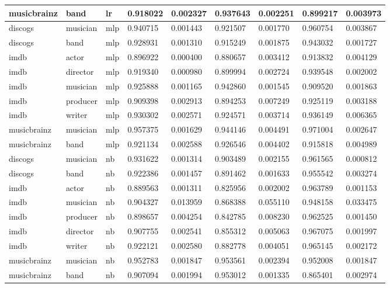 \documentclass[epsfig,a4paper,11pt,titlepage,twoside,openany]{book}
\begin{document}
\begin{longtable}{|l|l|l|l|l|l|l|l|l|}
musicbrainz & band     & lr    & 0.918022 & 0.002327 & 0.937643  & 0.002251 & 0.899217 & 0.003973 \\ \hline
discogs     & musician & mlp   & 0.940715 & 0.001443 & 0.921507  & 0.001770 & 0.960754 & 0.003867 \\
discogs     & band     & mlp   & 0.928931 & 0.001310 & 0.915249  & 0.001875 & 0.943032 & 0.001727 \\
imdb        & actor    & mlp   & 0.896922 & 0.000400 & 0.880657  & 0.003412 & 0.913832 & 0.004129 \\
imdb        & director & mlp   & 0.919340 & 0.000980 & 0.899994  & 0.002724 & 0.939548 & 0.002002 \\
imdb        & musician & mlp   & 0.925888 & 0.001165 & 0.942860  & 0.001545 & 0.909520 & 0.001863 \\
imdb        & producer & mlp   & 0.909398 & 0.002913 & 0.894253  & 0.007249 & 0.925119 & 0.003188 \\
imdb        & writer   & mlp   & 0.930302 & 0.002571 & 0.924571  & 0.003714 & 0.936149 & 0.006365 \\
musicbrainz & musician & mlp   & 0.957375 & 0.001629 & 0.944146  & 0.004491 & 0.971004 & 0.002647 \\ 
musicbrainz & band     & mlp   & 0.921134 & 0.002588 & 0.926546  & 0.004402 & 0.915818 & 0.004989 \\ \hline
discogs     & musician & nb    & 0.931622 & 0.001314 & 0.903489  & 0.002155 & 0.961565 & 0.000812 \\
discogs     & band     & nb    & 0.922386 & 0.001457 & 0.891462  & 0.001633 & 0.955542 & 0.003274 \\
imdb        & actor    & nb    & 0.889563 & 0.001311 & 0.825956  & 0.002002 & 0.963789 & 0.001153 \\
imdb        & musician & nb    & 0.904327 & 0.013959 & 0.868388  & 0.055110 & 0.948158 & 0.033475 \\
imdb        & producer & nb    & 0.898657 & 0.004254 & 0.842785  & 0.008230 & 0.962525 & 0.001450 \\
imdb        & director & nb    & 0.907755 & 0.002541 & 0.855312  & 0.005063 & 0.967075 & 0.001997 \\
imdb        & writer   & nb    & 0.922121 & 0.002580 & 0.882778  & 0.004051 & 0.965145 & 0.002172 \\
musicbrainz & musician & nb    & 0.952783 & 0.001847 & 0.953561  & 0.002394 & 0.952008 & 0.001847 \\
musicbrainz & band     & nb    & 0.907094 & 0.001994 & 0.953012  & 0.001335 & 0.865401 & 0.002974 \\ \hline

\end{longtable}
\end{document}
